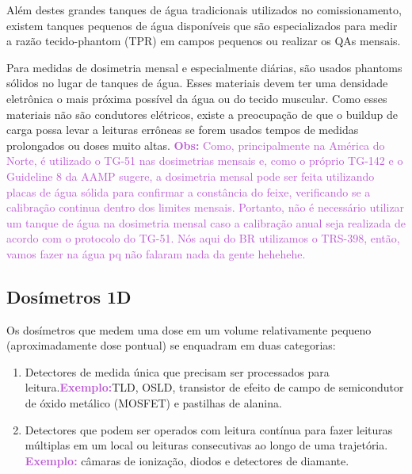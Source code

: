 \documentclass[11pt,a4paper]{article}
\begin{document}
	Além destes grandes tanques de água tradicionais utilizados no comissionamento, existem  tanques pequenos de água disponíveis que são especializados para medir a razão tecido-phantom (TPR) em campos pequenos ou realizar os QAs mensais.

	Para medidas de dosimetria mensal e especialmente diárias, são usados phantoms sólidos no lugar de tanques de água. Esses materiais devem ter uma densidade eletrônica o mais próxima possível da água ou do tecido muscular. Como esses materiais não são condutores elétricos, existe a preocupação de que o buildup de carga possa levar a leituras errôneas se forem usados tempos de medidas prolongados ou doses muito altas. \textcolor{MediumOrchid}{\textbf{Obs:} Como, principalmente na América do Norte, é utilizado o TG-51 nas dosimetrias mensais e, como o próprio TG-142 e o Guideline 8 da AAMP sugere, a dosimetria mensal pode ser feita utilizando placas de água sólida para confirmar a constância do feixe, verificando se a calibração continua dentro dos limites mensais.  Portanto, não é necessário utilizar um tanque de água na dosimetria mensal caso a calibração anual seja realizada de acordo com o protocolo do TG-51. Nós aqui do BR utilizamos o TRS-398, então, vamos fazer na água pq não falaram nada da gente hehehehe.}

\subsection*{Dosímetros 1D}

	Os dosímetros que medem uma dose em um volume relativamente pequeno (aproximadamente dose pontual) se enquadram em duas categorias:

	\begin{enumerate}
		\item Detectores de medida única que precisam ser processados para leitura.\textcolor{MediumOrchid}{\textbf{Exemplo:}}TLD, OSLD, transistor de efeito de campo de semicondutor de óxido metálico (MOSFET) e pastilhas de alanina. 
		\item Detectores que podem ser operados com leitura contínua para fazer leituras múltiplas em um local ou leituras consecutivas ao longo de uma trajetória. \textcolor{MediumOrchid}{\textbf{Exemplo:}} câmaras de ionização, diodos e detectores de diamante.
	\end{enumerate}
\end{document}
